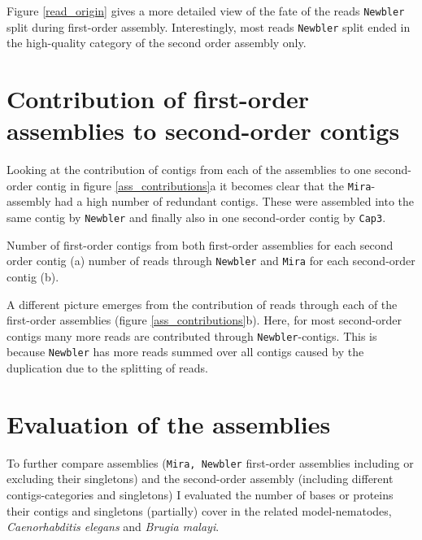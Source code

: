 
Figure \ref{read_origin} gives a more detailed view of the fate of the
reads \texttt{Newbler} split during first-order
assembly. Interestingly, most reads \texttt{Newbler} split ended in
the high-quality category of the second order assembly only.

\section{Contribution of first-order assemblies to second-order contigs}
\label{sec:contr-firs-order}

Looking at the contribution of contigs from each of the assemblies to
one second-order contig in figure \ref{ass_contributions}a it becomes
clear that the \texttt{Mira}-assembly had a high number of redundant
contigs. These were assembled into the same contig by \texttt{Newbler}
and finally also in one second-order contig by \texttt{Cap3}.

{Number of first-order contigs from both first-order assemblies for
  each second order contig (a) number of reads through
  \texttt{Newbler} and \texttt{Mira} for each second-order contig
  (b).}

A different picture emerges from the contribution of reads through
each of the first-order assemblies (figure
\ref{ass_contributions}b). Here, for most second-order contigs many
more reads are contributed through \texttt{Newbler}-contigs. This is
because \texttt{Newbler} has more reads summed over all contigs caused
by the duplication due to the splitting of reads.

\section{Evaluation of the assemblies}
\label{sec:eval-three-assembl}

To further compare assemblies (\texttt{Mira, Newbler} first-order
assemblies including or excluding their singletons) and the
second-order assembly (including different contigs-categories and
singletons) I evaluated the number of bases or proteins their contigs
and singletons (partially) cover in the related model-nematodes,
\textit{Caenorhabditis elegans} and \textit{Brugia malayi}.

